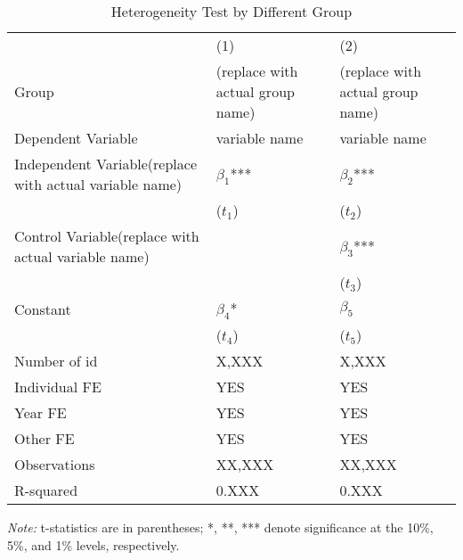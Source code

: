 \begin{table}[htbp]
    \caption{Heterogeneity Test by Different Group}
    \label{Use the regression name as the label}
    \centering
    \begin{tabular}{p{3.6cm}p{3.6cm}p{3.6cm}} %
    \toprule
    & (1) & (2) \\
    Group & (replace with actual group name)  & (replace with actual group name)  \\
    Dependent Variable & variable name & variable name \\
    \midrule
    Independent Variable(replace with actual variable name)   & $\beta_1$*** & $\beta_2$*** \\
                & ($t_1$) & ($t_2$) \\
    Control Variable(replace with actual variable name)     &  & $\beta_3$*** \\  %
                &  & ($t_3$) \\
    Constant    & $\beta_4$* & $\beta_5$ \\
                & ($t_4$) & ($t_5$) \\
    
    Number of id       & X,XXX        & X,XXX \\
    Individual FE      & YES          & YES \\ %
    Year FE            & YES          & YES \\ %
    Other FE           & YES          & YES \\ %
    Observations       & XX,XXX       & XX,XXX \\
    R-squared          & 0.XXX        & 0.XXX \\
    \bottomrule
    \end{tabular}
    \begin{tablenotes}
    \small
    \item \textit{Note:} t-statistics are in parentheses; *, **, *** denote significance at the 10\%, 5\%, and 1\% levels, respectively.
    \end{tablenotes}
    \end{table}